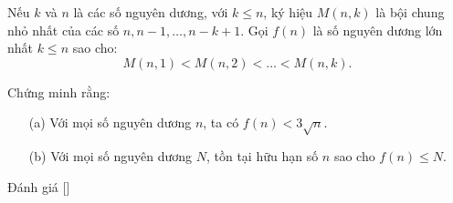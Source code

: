 \ifshowproblem
\begin{problem}\label{problem:ROU-2015-TST-D3-P3}
    Nếu \( k \) và \( n \) là các số nguyên dương, với \( k \leq n \), ký hiệu \( M(n,k) \) là bội chung nhỏ nhất của các số 
    \( n, n-1, \ldots, n - k + 1 \).  
    Gọi \( f(n) \) là số nguyên dương lớn nhất \( k \leq n \) sao cho:
    \[
        M(n,1) < M(n,2) < \ldots < M(n,k).
    \]
    
    Chứng minh rằng:
    \begin{itemize}[topsep=0pt, partopsep=0pt, itemsep=0pt]
        \item[(a)] Với mọi số nguyên dương \( n \), ta có \( f(n) < 3\sqrt{n} \).
        \item[(b)] Với mọi số nguyên dương \( N \), tồn tại hữu hạn số \( n \) sao cho \( f(n) \leq N \).
    \end{itemize}
\end{problem}
\fi

\ifshowinfo
Đánh giá [\textbf{}]\footnotemark
{}
\fi